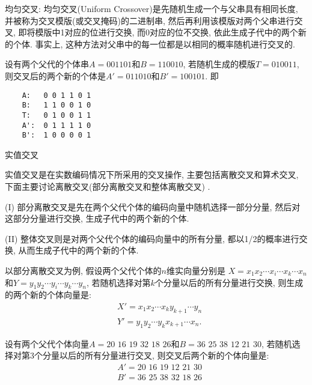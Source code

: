  均匀交叉: 均匀交叉(Uniform Crossover)是先随机生成一个与父串具有相同长度, 并被称为交叉模版(或交叉掩码)的二进制串, 然后再利用该模版对两个父串进行交叉, 即将模版中1对应的位进行交换, 而0对应的位不交换, 依此生成子代中的两个新的个体.
事实上, 这种方法对父串中的每一位都是以相同的概率随机进行交叉的.

\begin{example}
设有两个父代的个体串$A=001101$和$B=110010$, 若随机生成的模版$T=010011$, 则交叉后的两个新的个体是$A'=011010$和$B'=100101$. 即
\begin{center}
\begin{Verbatim}
    A:   0 0 1 1 0 1
    B:   1 1 0 0 1 0
    T:   0 1 0 0 1 1
    A':  0 1 1 1 1 0
    B':  1 0 0 0 0 1
\end{Verbatim}
\end{center}

     实值交叉
\end{example}

实值交叉是在实数编码情况下所采用的交叉操作, 主要包括离散交叉和算术交叉, 下面主要讨论离散交叉(部分离散交叉和整体离散交叉) .

(I) 部分离散交叉是先在两个父代个体的编码向量中随机选择一部分分量, 然后对这部分分量进行交换, 生成子代中的两个新的个体.

(II) 整体交叉则是对两个父代个体的编码向量中的所有分量, 都以1/2的概率进行交换, 从而生成子代中的两个新的个体.

以部分离散交叉为例, 假设两个父代个体的$n$维实向量分别是 $X=x_1x_2\cdots x_i\cdots x_k\cdots x_n$和$Y=y_1 y_2\cdots y_i \cdots y_k \cdots y_n$, 若随机选择对第$k$个分量以后的所有分量进行交换, 则生成的两个新的个体向量是:
\begin{align}
  &X'= x_1 x_2 \cdots x_k y_{k+1} \cdots y_n\\
  &Y'= y_1 y_2 \cdots y_k x_{k+1} \cdots x_n.
\end{align}

\begin{example}
设有两个父代个体向量$A=20\,\,  16\,\,  19\,\,  32 \,\, 18 \,\, 26$和$B=36\,\,  25\,\,  38\,\,  12\,\,  21\,\,  30$, 若随机选择对第3个分量以后的所有分量进行交叉, 则交叉后两个新的个体向量是:
\begin{align}
  &A'= 20\,\, 16\,\,  19\,\,  12\,\,  21\,\,  30\\
  &B'= 36\,\,  25\,\,  38\,\,  32\,\,  18\,\,  26
\end{align}
\vspace{-0.3cm}
\end{example}

